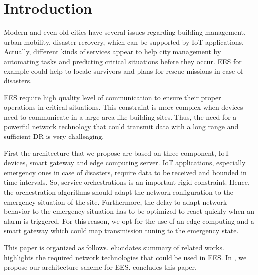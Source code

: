 \section{Introduction} \label{sec:Introduction}

Modern and even old cities have several issues regarding building management,
	urban mobility,
	disaster recovery,
	which can be supported by \ac{IoT} applications.
Actually,
	different kinds of services appear to help city management by automating tasks and predicting critical situations before they occur.
\ac{EES} for example could help to locate survivors and plans for rescue missions in case of disasters.

\ac{EES} require high quality level of communication to ensure their proper operations in critical situations.
This constraint is more complex when devices need to communicate in a large area like building sites.
Thus,
	the need for a powerful network technology that could transmit data with a long range and sufficient \ac{DR} is very challenging.

First the architecture that we propose are based on three component,
	\ac{IoT} devices,
	smart gateway and edge computing server.
\ac{IoT} applications,
	especially emergency ones in case of disasters,
	require data to be received and bounded in time intervals.
So,
	service orchestrations is an important rigid constraint.
Hence,
	the orchestration algorithms should adapt the network configuration to the emergency situation of the site.
Furthermore,
	the delay to adapt network behavior to the emergency situation has to be optimized to react quickly when an alarm is triggered.
For this reason,
	we opt for the use of an edge computing and a smart gateway which could map transmission tuning to the emergency state.






This paper is organized as follows.
 elucidates summary of related works.
 highlights the required network technologies that could be used in \ac{EES}.
In ,
	we propose our architecture scheme for \ac{EES}.
 concludes this paper.

